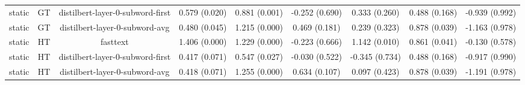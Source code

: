 \begin{sidewaystable}[htb]
\begin{tabular}{@{}ccccccccc@{}}
        static & GT & distilbert-layer-0-subword-first & 0.579 (0.020) & 0.881 (0.001) & -0.252 (0.690) & 0.333 (0.260) & 0.488 (0.168) & -0.939 (0.992) \\
        static & GT & distilbert-layer-0-subword-avg & 0.480 (0.045) & 1.215 (0.000) & 0.469 (0.181) & 0.239 (0.323) & 0.878 (0.039) & -1.163 (0.978) \\
        static & HT & fasttext & 1.406 (0.000) & 1.229 (0.000) & -0.223 (0.666) & 1.142 (0.010) & 0.861 (0.041) & -0.130 (0.578) \\
        static & HT & distilbert-layer-0-subword-first & 0.417 (0.071) & 0.547 (0.027) & -0.030 (0.522) & -0.345 (0.734) & 0.488 (0.168) & -0.917 (0.990) \\
        static & HT & distilbert-layer-0-subword-avg & 0.418 (0.071) & 1.255 (0.000) & 0.634 (0.107) & 0.097 (0.423) & 0.878 (0.039) & -1.191 (0.978) \\
        \bottomrule
    \end{tabular}
\end{sidewaystable}